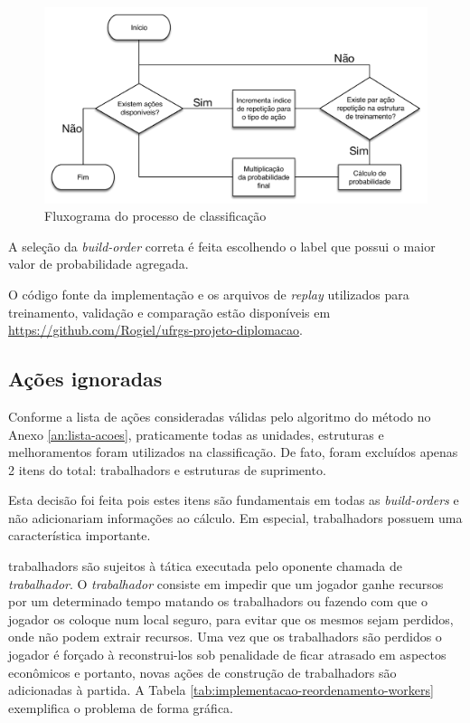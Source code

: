 \begin{figure}[htb]
	\caption{\label{fig:impl-classify-fluxogram} Fluxograma do processo de classificação}
	\begin{center}
	    \includegraphics[width=\linewidth]{Images/Replay-Action_Classification-Fluxogram.pdf}
	\end{center}
\end{figure}

A seleção da \textit{\gls{build-order}} correta é feita escolhendo o label que possui o maior valor de probabilidade agregada.

O código fonte da implementação e os arquivos de \textit{replay} utilizados para treinamento, validação e comparação estão disponíveis em \url{https://github.com/Rogiel/ufrgs-projeto-diplomacao}.

			\subsection{Ações ignoradas}
Conforme a lista de ações consideradas válidas pelo algoritmo do método no Anexo \ref{an:lista-acoes}, praticamente todas as \glspl{unidade}, \glspl{estrutura} e \glspl{melhoramento} foram utilizados na classificação. De fato, foram excluídos apenas 2 itens do total: \glspl{trabalhador} e \glspl{estrutura} de \gls{suprimento}.

Esta decisão foi feita pois estes itens são fundamentais em todas as \textit{\glspl{build-order}} e não adicionariam informações ao cálculo. Em especial, \glspl{trabalhador} possuem uma característica importante.

\Glspl{trabalhador} são sujeitos à tática executada pelo oponente chamada de \textit{\gls{trabalhador}}. O \textit{\gls{trabalhador}} consiste em impedir que um jogador ganhe \glspl{recurso} por um determinado tempo matando os \glspl{trabalhador} ou fazendo com que o jogador os coloque num local seguro, para evitar que os mesmos sejam perdidos, onde não podem extrair \glspl{recurso}. Uma vez que os \glspl{trabalhador} são perdidos o jogador é forçado à reconstrui-los sob penalidade de ficar atrasado em aspectos econômicos e portanto, novas ações de construção de \glspl{trabalhador} são adicionadas à partida. A Tabela \ref{tab:implementacao-reordenamento-workers} exemplifica o problema de forma gráfica.

